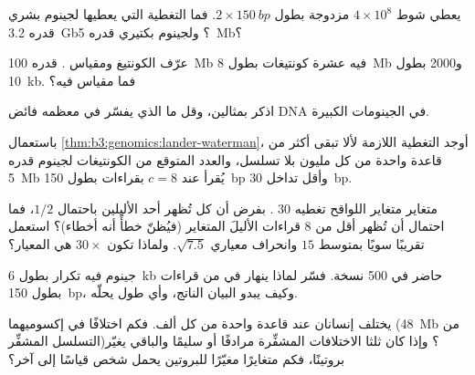 \begin{exercise}[$\star$]\label{exo:b3:genomics:2}
يعطي شوط $4\times 10^{8}$  مزدوجة بطول $2\times \qty{150}{bp}$.
فما التغطية التي يعطيها لجينوم بشري قدره \qty{3.2}{Gb}؟ ولجينوم
بكتيري قدره \qty{5}{Mb}؟
\end{exercise}

\begin{exercise}[$\star$]\label{exo:b3:genomics:3}
عرّف الكونتيغ  ومقياس .  قدره \qty{100}{Mb} فيه عشرة
كونتيغات بطول \qty{8}{Mb} و\num{2000} بطول \qty{10}{kb}. فما مقياس  فيه؟
\end{exercise}

\begin{exercise}[$\star$]\label{exo:b3:genomics:4}
اذكر  بمثالين، وقل ما الذي يفسّر في معظمه فائض DNA في
الجينومات الكبيرة.
\end{exercise}

\begin{exercise}[$\star\star$]\label{exo:b3:genomics:5}
باستعمال \cref{thm:b3:genomics:lander-waterman}، أوجد التغطية اللازمة
لألا تبقى أكثر من قاعدة واحدة من كل مليون بلا تسلسل، والعدد المتوقع
من الكونتيغات لجينوم قدره \qty{5}{Mb} يُقرأ عند $c = 8$ بقراءات
بطول \qty{150}{bp} وأقل تداخل \qty{30}{bp}.
\end{exercise}

\begin{exercise}[$\star\star$]\label{exo:b3:genomics:6}
متغاير متغاير اللواقح تغطيه $30$ . بفرض أن كل 
تُظهر أحد الأليلين باحتمال $1/2$، فما احتمال
أن تُظهر أقل من $8$ قراءات الأليلَ المتغاير (فيُظنّ خطأً أنه
أخطاء)؟ استعمل تقريبًا سويًا بمتوسط $15$ وانحراف
معياري $\sqrt{7.5}$. ولماذا تكون $30\times$ هي المعيار؟
\end{exercise}

\begin{exercise}[$\star\star$]\label{exo:b3:genomics:7}
جينوم فيه تكرار بطول \qty{6}{kb} حاضر في \num{500} نسخة.
فسّر لماذا ينهار في  من قراءات بطول \qty{150}{bp}، وكيف يبدو
البيان الناتج، وأي طول  يحلّه.
\end{exercise}

\begin{exercise}[$\star\star$]\label{exo:b3:genomics:8}
يختلف إنسانان عند قاعدة واحدة من كل ألف. فكم اختلافًا في
إكسوميهما (\qty{48}{Mb} من التسلسل المشفِّر)؟ وإذا كان ثلثا الاختلافات
المشفِّرة مرادفًا أو سليمًا والباقي يغيّر بروتينًا، فكم
متغايرًا مغيّرًا للبروتين يحمل شخص قياسًا إلى
آخر؟
\end{exercise}

